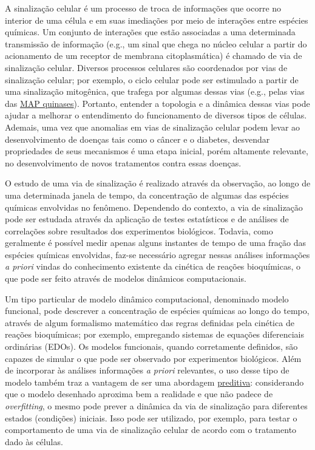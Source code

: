 \documentclass[12pt]{article}
\begin{document}
A sinalização celular é um processo de troca de informações que ocorre no interior de uma célula e em suas imediações por meio de interações entre espécies químicas. Um conjunto de interações que estão associadas a uma determinada transmissão de informação (e.g., um sinal que chega no núcleo celular a partir do acionamento de um receptor de membrana citoplasmática) é chamado de via de sinalização celular.
Diversos processos celulares são coordenados por vias de sinalização celular; por exemplo, o ciclo celular pode ser estimulado a partir de uma sinalização mitogênica, que trafega por algumas dessas vias (e.g., pelas vias das \href{https://en.wikipedia.org/wiki/Mitogen-activated\_protein\_kinase}{MAP quinases}). Portanto, entender a topologia e a dinâmica dessas vias pode ajudar a melhorar o entendimento do funcionamento de diversos tipos de células. Ademais, uma vez que anomalias em vias de sinalização celular podem levar ao desenvolvimento de doenças tais como o câncer e o diabetes, desvendar propriedades de seus mecanismos é uma etapa inicial, porém altamente relevante, no desenvolvimento de novos tratamentos contra essas doenças.

O estudo de uma via de sinalização é realizado através da observação, ao longo de uma determinada janela de tempo, da concentração de algumas das espécies químicas envolvidas no fenômeno. Dependendo do contexto, a via de sinalização pode ser estudada através da aplicação de testes estatísticos e de análises de correlações sobre resultados dos experimentos biológicos. Todavia, como geralmente é possível medir apenas alguns instantes de tempo de uma fração das espécies químicas envolvidas, faz-se necessário agregar nessas análises informações {\em a priori} vindas do conhecimento existente da cinética de reações bioquímicas, o que pode ser feito através de modelos dinâmicos computacionais. 

Um tipo particular de modelo dinâmico computacional, denominado modelo funcional, pode descrever a concentração de espécies químicas ao longo do tempo, através de algum formalismo matemático das regras definidas pela cinética de reações bioquímicas; por exemplo, empregando sistemas de equações diferenciais ordinárias (EDOs). Os modelos funcionais, quando corretamente definidos, são capazes de simular o que pode ser observado por experimentos biológicos. Além de incorporar às análises informações {\em a priori} relevantes, o uso desse tipo de modelo também traz a vantagem de ser uma abordagem \underline{preditiva}: considerando que o modelo desenhado aproxima bem a realidade e que não padece de {\em overfitting}, o mesmo pode prever a dinâmica da via de sinalização para diferentes estados (condições) iniciais. Isso pode ser utilizado, por exemplo, para testar o comportamento de uma via de sinalização celular de acordo com o tratamento dado às células.
\end{document}
